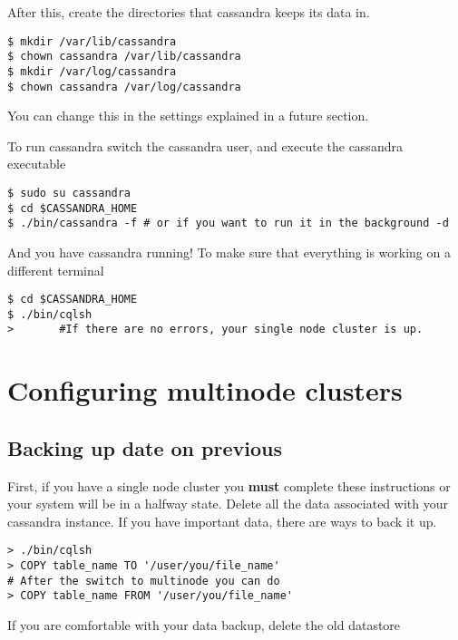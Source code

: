 \documentclass[9pt,twocolumn,twoside]{idsi}
\begin{document}
After this, create the directories that cassandra keeps its data in.

\begin{lstlisting}[breaklines]
$ mkdir /var/lib/cassandra
$ chown cassandra /var/lib/cassandra
$ mkdir /var/log/cassandra
$ chown cassandra /var/log/cassandra
\end{lstlisting}

You can change this in the settings explained in a future section.

To run cassandra switch the cassandra user, and execute the cassandra executable

\begin{lstlisting}[breaklines]
$ sudo su cassandra
$ cd $CASSANDRA_HOME
$ ./bin/cassandra -f # or if you want to run it in the background -d
\end{lstlisting}

And you have cassandra running! To make sure that everything is working on a different terminal

\begin{lstlisting}[breaklines]
$ cd $CASSANDRA_HOME
$ ./bin/cqlsh
>       #If there are no errors, your single node cluster is up.
\end{lstlisting}

\section{Configuring multinode clusters}

\subsection{Backing up date on previous}

First, if you have a single node cluster you \textbf{must} complete these instructions or your system will be in a halfway state. Delete all the data associated with your cassandra instance. If you have important data, there are ways to back it up.


\begin{lstlisting}
> ./bin/cqlsh
> COPY table_name TO '/user/you/file_name'
# After the switch to multinode you can do
> COPY table_name FROM '/user/you/file_name'
\end{lstlisting}

If you are comfortable with your data backup, delete the old datastore
\end{document}
